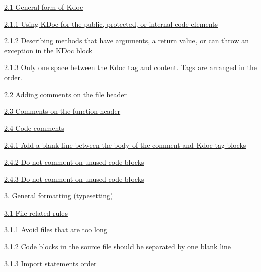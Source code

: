\hspace{0.5cm}\hyperref[sec:2.1]{ 2.1 General form of Kdoc}

\hspace{1.0cm}\hyperref[sec:2.1.1]{ 2.1.1 Using KDoc for the public, protected, or internal code elements}

\hspace{1.0cm}\hyperref[sec:2.1.2]{ 2.1.2 Describing methods that have arguments, a return value, or can throw an exception in the KDoc block}

\hspace{1.0cm}\hyperref[sec:2.1.3]{ 2.1.3 Only one space between the Kdoc tag and content. Tags are arranged in the order.}

\hspace{0.5cm}\hyperref[sec:2.2]{ 2.2 Adding comments on the file header}

\hspace{0.5cm}\hyperref[sec:2.3]{ 2.3 Comments on the function header}

\hspace{0.5cm}\hyperref[sec:2.4]{ 2.4 Code comments}

\hspace{1.0cm}\hyperref[sec:2.4.1]{ 2.4.1 Add a blank line between the body of the comment and Kdoc tag-blocks}

\hspace{1.0cm}\hyperref[sec:2.4.2]{ 2.4.2 Do not comment on unused code blocks}

\hspace{1.0cm}\hyperref[sec:2.4.3]{ 2.4.3 Do not comment on unused code blocks}

\hspace{1.0cm}\hyperref[sec:]{}

\hspace{0.0cm}\hyperref[sec:3.]{3. General formatting (typesetting)}

\hspace{0.5cm}\hyperref[sec:3.1]{ 3.1 File-related rules}

\hspace{1.0cm}\hyperref[sec:3.1.1]{ 3.1.1 Avoid files that are too long}

\hspace{1.0cm}\hyperref[sec:3.1.2]{ 3.1.2 Code blocks in the source file should be separated by one blank line}

\hspace{1.0cm}\hyperref[sec:3.1.3]{ 3.1.3 Import statements order}

